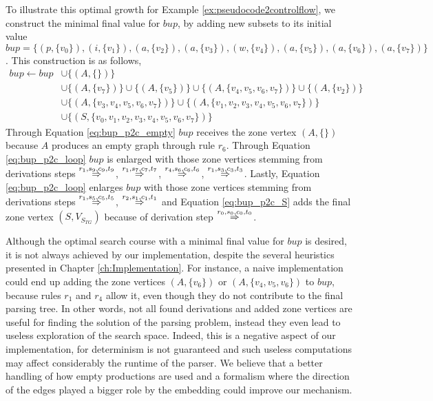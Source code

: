 To illustrate this optimal growth for Example \ref{ex:pseudocode2controlflow}, we construct the minimal final value for $bup$, by adding new subsets to its initial value $bup = \{ (p,\{v_0\}), (i,\{v_1\}), (a,\{v_2\}), (a,\{v_3\}), (w,\{v_4\}), (a,\{v_5\}), (a,\{v_6\}), (a,\{v_7\}) \}$. This construction is as follows,
\begin{align}
	\label{eq:bup_p2c_empty}
	bup \gets bup & \cup \{ (A, \{\}) \} \\
	\label{eq:bup_p2c_loop}
	& \cup \{ (A,\{v_7\}) \} \cup \{ (A,\{v_5\}) \} \cup \{ (A,\{v_4,v_5,v_6,v_7\}) \} \cup \{ (A,\{v_2\}) \} \\
	\label{eq:bup_p2c_if}
	& \cup \{ (A,\{v_3,v_4,v_5,v_6,v_7\}) \} \cup \{ (A, \{v_1,v_2,v_3,v_4,v_5,v_6,v_7\}) \} \\
	\label{eq:bup_p2c_S}
	& \cup \{ (S, \{v_0,v_1,v_2,v_3,v_4,v_5,v_6,v_7\}) \}
\end{align}
Through Equation \ref{eq:bup_p2c_empty} $bup$ receives the zone vertex $(A, \{\})$ because $A$ produces an empty graph through rule $r_6$. Through Equation \ref{eq:bup_p2c_loop} $bup$ is enlarged with those zone vertices stemming from derivations steps $\tderiv{r_1}{s_9,c_9,t_9}{}$, $\tderiv{r_1}{s_7,c_7,t_7}{}$, $\tderiv{r_4}{s_6,c_6,t_6}{}$, $\tderiv{r_1}{s_3,c_3,t_3}{}$. Lastly, Equation \ref{eq:bup_p2c_loop} enlarges $bup$ with those zone vertices stemming from derivations steps $\tderiv{r_1}{s_5,c_5,t_5}{}$, $\tderiv{r_2}{s_1,c_1,t_1}{}$ and Equation \ref{eq:bup_p2c_S} adds the final zone vertex $(S, V_{S_{TG}})$ because of derivation step $\tderiv{r_0}{s_0,c_0,t_0}{}$.

Although the optimal search course with a minimal final value for $bup$ is desired, it is not always achieved by our implementation, despite the several heuristics presented in Chapter \ref{ch:Implementation}. For instance, a naive implementation could end up adding the zone vertices $(A,\{v_6\})$ or $(A,\{v_4,v_5,v_6\}) $ to $bup$, because rules $r_1$ and $r_4$ allow it, even though they do not contribute to the final parsing tree. In other words, not all found derivations and added zone vertices are useful for finding the solution of the parsing problem, instead they even lead to useless exploration of the search space. Indeed, this is a negative aspect of our implementation, for determinism is not guaranteed and such useless computations may affect considerably the runtime of the parser. We believe that a better handling of how empty productions are used and a formalism where the direction of the edges played a bigger role by the embedding could improve our mechanism.

